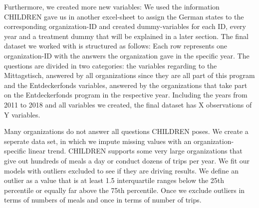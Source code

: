 \documentclass[12pt, a4paper, titlepage]{article}\usepackage[]{graphicx}\usepackage[]{color}
\begin{document}
Furthermore, we created more new variables: We used the information CHILDREN gave us in another excel-sheet to assign the German states to the corresponding organization-ID and created dummy-variables for each ID, every year and a treatment dummy that will be explained in a later section. 
The final dataset we worked with is structured as follows: Each row represents one organization-ID with the answers the organization gave in the specific year. The questions are divided in two categories: the variables regarding to the Mittagstisch, answered by all organizations since they are all part of this program and the Entdeckerfonds variables, answered by the organizations that take part on the Entdeckerfonds program in the respective year. Including the years from 2011 to 2018 and all variables we created, the final dataset has X observations of Y variables.

Many organizations do not answer all questions CHILDREN poses. We create a seperate data set, in which we impute missing values with an organization-specific linear trend. CHILDREN supports some very large organizations that give out hundreds of meals a day or conduct dozens of trips per year. We fit our models with outliers excluded to see if they are driving results. We define an outlier as a value that is at least 1.5 interquartile ranges below the 25th percentile or equally far above the 75th percentile. Once we exclude outliers in terms of numbers of meals and once in terms of number of trips.
\end{document}
